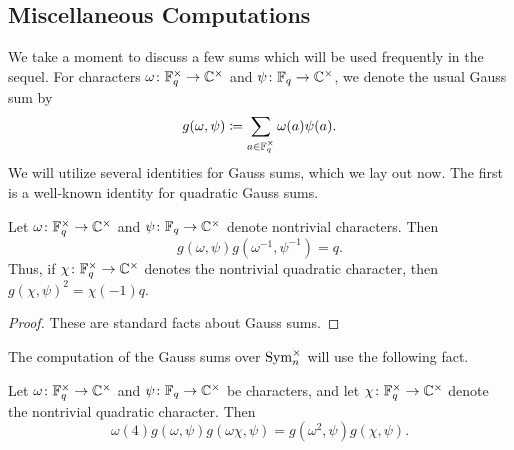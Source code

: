 \subsection{Miscellaneous Computations}
We take a moment to discuss a few sums which will be used frequently in the sequel. For characters $\omega\colon\mathbb F_q^\times\to\mathbb C^\times$ and $\psi\colon\mathbb F_q\to\mathbb C^\times$, we denote the usual Gauss sum by
\[g(\omega,\psi)\coloneqq\sum_{a\in\mathbb F_q^\times}\omega(a)\psi(a).\]
We will utilize several identities for Gauss sums, which we lay out now. The first is a well-known identity for quadratic Gauss sums.
\begin{prop} \label{prop:mag-gauss-sum}
    Let $\omega\colon\mathbb F_q^\times\to\mathbb C^\times$ and $\psi\colon\mathbb F_q\to\mathbb C^\times$ denote nontrivial characters. Then
    \[g(\omega,\psi)g\left(\omega^{-1},\psi^{-1}\right)=q.\]
    Thus, if $\chi\colon\mathbb F_q^\times\to\mathbb C^\times$ denotes the nontrivial quadratic character, then $g(\chi,\psi)^2=\chi(-1)q$.
\end{prop}
\begin{proof}
    These are standard facts about Gauss sums.
\end{proof}
The computation of the Gauss sums over $\operatorname{Sym}_n^\times$ will use the following fact.
\begin{prop} \label{prop:quad-twist-gauss-sum}
    Let $\omega\colon\mathbb F_q^\times\to\mathbb C^\times$ and $\psi\colon\mathbb F_q\to\mathbb C^\times$ be characters, and let $\chi\colon\mathbb F_q^\times\to\mathbb C^\times$ denote the nontrivial quadratic character. Then
    \[\omega(4)g(\omega,\psi)g(\omega\chi,\psi)=g\left(\omega^2,\psi\right)g(\chi,\psi).\]
\end{prop}
